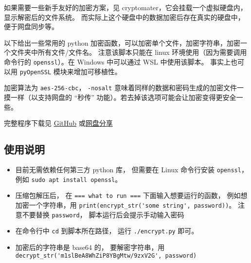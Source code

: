 

如果需要一些新手友好的加密方案，见 cryptomater，它会挂载一个虚拟硬盘内，显示解密后的文件系统。 而实际上这个硬盘中的数据加密后存在真实的硬盘中，便于网盘同步等。

以下给出一些常用的 python 加密函数，可以加密单个文件，加密字符串，加密一个文件夹中所有文件/文件名。 注意该脚本只能在 linux 环境使用（因为需要调用命令行的 \verb`openssl`）。在 Windows 中可以通过 WSL 中使用该脚本。 事实上也可以用 \verb|pyOpenSSL| 模块来增加可移植性。

加密算法为 \verb`aes-256-cbc`， \verb`-nosalt` 意味着同样的数据和密码生成的加密文件一摸一样（以支持网盘的 “秒传” 功能）。若去掉该选项可能会让加密变得更安全一些。

完整程序下载见 \href{https://github.com/MacroUniverse/MyPythonLibrary/tree/master/encrypt}{GitHub} 或\href{https://pan.baidu.com/s/1y4Asx-oS4ShGlN9kIyRZeg?pwd=3q1d#list/path=\%252F}{网盘分享}

\subsection{使用说明}
\begin{itemize}
\item 目前无需依赖任何第三方 python 库， 但需要在 Linux 命令行安装 \verb`openssl`， 例如 \verb`sudo apt install openssl`。
\item 压缩包解压后， 在 \verb`=== what to run ===` 下面输入想要运行的函数， 例如想加密一个字符串，用 \verb`print(encrypt_str('some string', password))`。 注意不要替换 \verb`password`， 脚本运行后会提示手动输入密码
\item 在命令行中 \verb`cd` 到脚本所在路径， 运行 \verb`./encrypt.py` 即可。
\item 加密后的字符串是 base64 的， 要解密字符串，用 \verb`decrypt_str('m1slBeA8WhZiP8YBgMtw/9zxV2G', password)`
\end{itemize}

